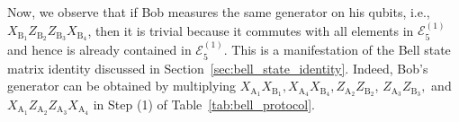 \documentclass[journal,onecolumn]{IEEEtran}
\newif\ifnotes
\newcommand{\narayanan}[1]{\ifnotes{{\color{blue} [Narayanan: #1]}}\fi}
\newcommand{\bane}[1]{\ifnotes{{\color{dkgreen} [Bane: #1]}}\fi}
\begin{document}
\begin{enumerate}
Now, we observe that if Bob measures the same generator on his qubits, i.e., $X_{\text{B}_1} Z_{\text{B}_2} Z_{\text{B}_3} X_{\text{B}_4}$, then it is trivial because it commutes with all elements in $\mathcal{E}_5^{(1)}$ and 
hence is already contained in $\mathcal{E}_5^{(1)}$.
This is a manifestation of the Bell state matrix identity discussed in Section~\ref{sec:bell_state_identity}.
Indeed, Bob's generator can be obtained by multiplying $X_{\text{A}_1} X_{\text{B}_1}, X_{\text{A}_4} X_{\text{B}_4}, Z_{\text{A}_2} Z_{\text{B}_2}$, $Z_{\text{A}_3} Z_{\text{B}_3},$ and $X_{\text{A}_1} Z_{\text{A}_2} Z_{\text{A}_3} X_{\text{A}_4}$ in Step (1) of Table~\ref{tab:bell_protocol}. \\



\end{enumerate}
\end{document}
